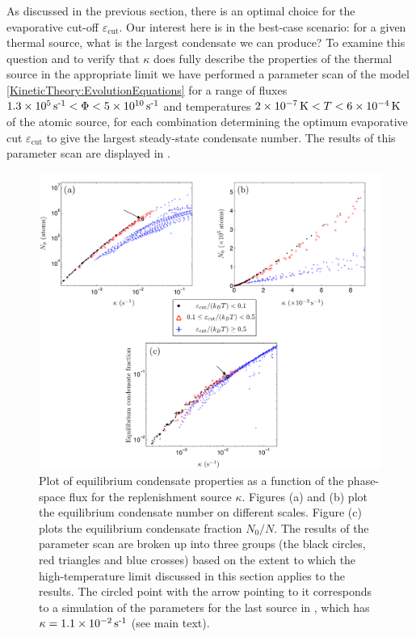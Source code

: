 As discussed in the previous section, there is an optimal choice for the evaporative cut-off $\varepsilon_\text{cut}$. Our interest here is in the best-case scenario: for a given thermal source, what is the largest condensate we can produce? To examine this question and to verify that $\kappa$ does fully describe the properties of the thermal source in the appropriate limit we have performed a parameter scan of the model \eqref{KineticTheory:EvolutionEquations} for a range of fluxes $\unit[1.3\times 10^5]{s\textsuperscript{-1}} < \Phi < \unit[5\times 10^{10}]{s\textsuperscript{-1}}$ and temperatures $2 \times\unit[10^{-7}]{K} < T < 6\times\unit[10^{-4}]{K}$ of the atomic source, for each combination determining the optimum evaporative cut $\varepsilon_\text{cut}$ to give the largest steady-state condensate number.  The results of this parameter scan are displayed in .

\begin{figure}
    \centering
    \includegraphics[width=15cm]{FigureOfMerit}
    \caption{Plot of equilibrium condensate properties as a function of the phase-space flux for the replenishment source $\kappa$. Figures (a) and (b) plot the equilibrium condensate number on different scales. Figure (c) plots the equilibrium condensate fraction $N_0/N$.  The results of the parameter scan are broken up into three groups (the black circles, red triangles and blue crosses) based on the extent to which the high-temperature limit discussed in this section applies to the results. The circled point with the arrow pointing to it corresponds to a simulation of the parameters for the last source in , which has $\kappa= \unit[1.1\times 10^{-2}]{s\textsuperscript{-1}}$ (see main text).}
    \label{KineticTheory:FigureOfMerit}
\end{figure}


